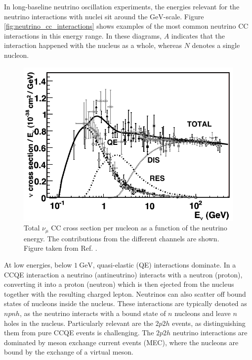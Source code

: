 In long-baseline neutrino oscillation experiments, the energies relevant for the neutrino interactions with nuclei sit around the $\mathrm{GeV}$-scale. Figure \ref{fig:neutrino_cc_interactions} shows examples of the most common neutrino CC interactions in this energy range. In these diagrams, $A$ indicates that the interaction happened with the nucleus as a whole, whereas $N$ denotes a single nucleon.

\begin{figure}[t]
	\centering
	\includegraphics[width=.85\linewidth]{Images/Nu/numu_cc_cross_section.pdf}
	\caption[Total muon neutrino CC cross section per nucleon as a function of the neutrino energy.]{Total $\nu_{\mu}$ CC cross section per nucleon as a function of the neutrino energy. The contributions from the different channels are shown. Figure taken from Ref. \cite{Formaggio2012}.}
	\label{fig:numu_cc_cross_section}
\end{figure}

At low energies, below $1~\mathrm{GeV}$, quasi-elastic (QE) interactions dominate. In a CCQE interaction a neutrino (antineutrino) interacts with a neutron (proton), converting it into a proton (neutron) which is then ejected from the nucleus together with the resulting charged lepton. Neutrinos can also scatter off bound states of nucleons inside the nucleus. These interactions are typically denoted as $npnh$, as the neutrino interacts with a bound state of $n$ nucleons and leave $n$ holes in the nucleus. Particularly relevant are the $2p2h$ events, as distinguishing them from pure CCQE events is challenging. The $2p2h$ neutrino interactions are dominated by meson exchange current events (MEC), where the nucleons are bound by the exchange of a virtual meson.

